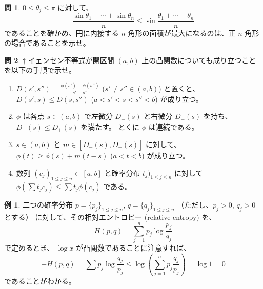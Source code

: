 \documentclass[a4paper]{jsarticle}
\theoremstyle{definition}
\newtheorem{Example}[Theorem]{例}
\newtheorem{Exercise}{問}%
\theoremstyle{remark}
\begin{document}
\begin{Exercise}
$0 \leq \theta_j \leq \pi$ に対して、
\[ 
\frac{\sin\theta_1 + \cdots + \sin \theta_n}{n} \leq \sin \frac{\theta_1 + \cdots +\theta_n}{n} 
\]
であることを確かめ、円に内接する $n$ 角形の面積が最大になるのは、正 $n$ 角形の場合であることを示せ。
\end{Exercise} 

\begin{Exercise}$\dagger$
  イェンセン不等式が開区間 $(a,b)$ 上の凸関数についても成り立つことを以下の手順で示せ。
  \begin{enumerate}
  \item
    $D(s',s'') = \displaystyle \frac{\phi(s') - \phi(s'')}{s' - s''}$ ($s' \not= s'' \in (a,b)$) と置くと、
    $D(s',s) \leq D(s,s'')$ ($a < s' < s < s'' < b$) が成り立つ。
  \item
    $\phi$ は各点 $s \in (a,b)$ で左微分 $D_-(s)$ と右微分 $D_+(s)$ を持ち、$D_-(s) \leq D_+(s)$ を満たす。
    とくに $\phi$ は連続である。
  \item
    $s \in (a,b)$ と $m \in [D_-(s),D_+(s)]$ に対して、
    $\phi(t) \geq \phi(s) + m(t-s)$ ($a < t < b$) が成り立つ。%
  \item 
    数列 $(c_j)_{1 \leq j \leq n} \subset [a,b]$ と確率分布 $t_j)_{1 \leq j \leq n}$ に対して
    $\phi(\sum t_jc_j) \leq \sum t_j \phi(c_j)$ である。
  \end{enumerate}
\end{Exercise}

\begin{Example}
二つの確率分布 $p = \{ p_j\}_{1 \leq j \leq n}$,
$q = \{ q_j\}_{1 \leq j \leq n}$ （ただし、$p_j >0$, $q_j>0$ とする）
に対して、その相対エントロピー (relative entropy) を、
\[
H(p,q) = \sum_{j=1}^n p_j \log \frac{p_j}{q_j}
\]
で定めるとき、
$\log x$ が凸関数であることに注意すれば、
\[
-H(p,q) = \sum p_j \log \frac{q_j}{p_j}
\leq \log\left(
\sum_{j=1}^n p_j \frac{q_j}{p_j}
\right) = \log 1 = 0
\]
であることがわかる。
\end{Example}
\end{document}
